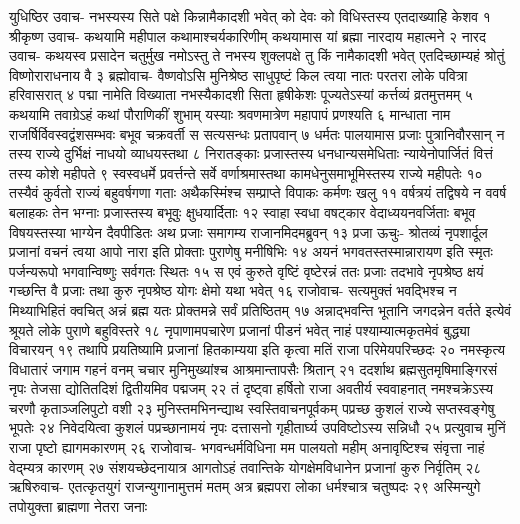 युधिष्ठिर उवाच-
नभस्यस्य सिते पक्षे किन्नामैकादशी भवेत् 
को देवः को विधिस्तस्य एतदाख्याहि केशव १
श्रीकृष्ण उवाच-
कथयामि महीपाल कथामाश्चर्यकारिणीम् 
कथयामास यां ब्रह्मा नारदाय महात्मने २
नारद उवाच-
कथयस्व प्रसादेन चतुर्मुख नमोऽस्तु ते 
नभस्य शुक्लपक्षे तु किं नामैकादशी भवेत् 
एतदिच्छाम्यहं श्रोतुं विष्णोराराधनाय वै ३
ब्रह्मोवाच-
वैष्णवोऽसि मुनिश्रेष्ठ साधुपृष्टं किल त्वया 
नातः परतरा लोके पवित्रा हरिवासरात् ४
पद्मा नामेति विख्याता नभस्यैकादशी सिता 
हृषीकेशः पूज्यतेऽस्यां कर्त्तव्यं व्रतमुत्तमम् ५
कथयामि तवाग्रेऽहं कथां पौराणिकीं शुभाम् 
यस्याः श्रवणमात्रेण महापापं प्रणश्यति ६
मान्धाता नाम राजर्षिर्विवस्वद्वंशसम्भवः 
बभूव चक्रवर्ती स सत्यसन्धः प्रतापवान् ७
धर्मतः पालयामास प्रजाः पुत्रानिवौरसान् 
न तस्य राज्ये दुर्भिक्षं नाधयो व्याधयस्तथा ८
निरातङ्काः प्रजास्तस्य धनधान्यसमेधिताः 
न्यायेनोपार्जितं वित्तं तस्य कोशे महीपते ९
स्वस्वधर्मे प्रवर्त्तन्ते सर्वे वर्णाश्रमास्तथा 
कामधेनुसमाभूमिस्तस्य राज्ये महीपतेः १०
तस्यैवं कुर्वतो राज्यं बहुवर्षगणा गताः 
अथैकस्मिंश्च सम्प्राप्ते विपाकः कर्मणः खलु ११
वर्षत्रयं तद्विषये न ववर्ष बलाहकः 
तेन भग्नाः प्रजास्तस्य बभूवुः क्षुधयार्दिताः १२
स्वाहा स्वधा वषट्कार वेदाध्ययनवर्जिताः 
बभूव विषयस्तस्या भाग्येन दैवपीडितः 
अथ प्रजाः समागम्य राजानमिदमब्रुवन् १३
प्रजा ऊचुः-
श्रोतव्यं नृपशार्दूल प्रजानां वचनं त्वया 
आपो नारा इति प्रोक्ताः पुराणेषु मनीषिभिः १४
अयनं भगवतस्तस्मान्नारायण इति स्मृतः 
पर्जन्यरूपो भगवान्विष्णुः सर्वगतः स्थितः १५
स एवं कुरुते वृष्टिं वृष्टेरन्नं ततः प्रजाः 
तदभावे नृपश्रेष्ठ क्षयं गच्छन्ति वै प्रजाः 
तथा कुरु नृपश्रेष्ठ योगः क्षेमो यथा भवेत् १६
राजोवाच-
सत्यमुक्तं भवद्भिश्च न मिथ्याभिहितं क्वचित् 
अन्नं ब्रह्म यतः प्रोक्तमन्ने सर्वं प्रतिष्ठितम् १७
अन्नाद्भवन्ति भूतानि जगदन्नेन वर्तते 
इत्येवं श्रूयते लोके पुराणे बहुविस्तरे १८
नृपाणामपचारेण प्रजानां पीडनं भवेत् 
नाहं पश्याम्यात्मकृतमेवं बुद्ध्या विचारयन् १९
तथापि प्रयतिष्यामि प्रजानां हितकाम्यया 
इति कृत्वा मतिं राजा परिमेयपरिच्छदः २०
नमस्कृत्य विधातारं जगाम गहनं वनम् 
चचार मुनिमुख्यांश्च आश्रमान्तापसैः श्रितान् २१
ददर्शाथ ब्रह्मसुतमृषिमाङ्गिरसं नृपः 
तेजसा द्योतितदिशं द्वितीयमिव पद्मजम् २२
तं दृष्ट्वा हर्षितो राजा अवतीर्य स्ववाहनात् 
नमश्चक्रेऽस्य चरणौ कृताञ्जलिपुटो वशी २३
मुनिस्तमभिनन्द्याथ स्वस्तिवाचनपूर्वकम् 
पप्रच्छ कुशलं राज्ये सप्तस्वङ्गेषु भूपतेः २४
निवेदयित्वा कुशलं पप्रच्छानामयं नृपः 
दत्तासनो गृहीतार्घ्य उपविष्टोऽस्य सन्निधौ २५
प्रत्युवाच मुनिं राजा पृष्टो ह्यागमकारणम् २६
राजोवाच-
भगवन्धर्मविधिना मम पालयतो महीम् 
अनावृष्टिश्च संवृत्ता नाहं वेद्म्यत्र कारणम् २७
संशयच्छेदनायात्र आगतोऽहं तवान्तिके 
योगक्षेमविधानेन प्रजानां कुरु निर्वृतिम् २८
ऋषिरुवाच-
एतत्कृतयुगं राजन्युगानामुत्तमं मतम् 
अत्र ब्रह्मपरा लोका धर्मश्चात्र चतुष्पदः २९
अस्मिन्युगे तपोयुक्ता ब्राह्मणा नेतरा जनाः 
